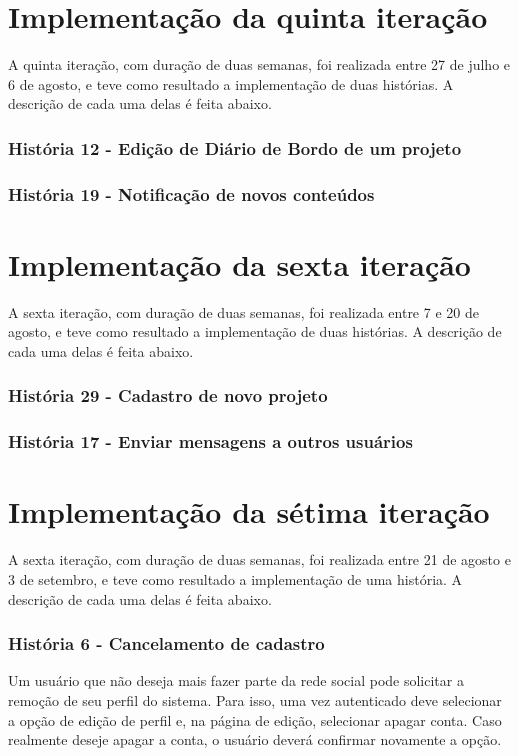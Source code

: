\documentclass[a4paper,12pt,font=plain,header=plain]{abnt}
\begin{document}
 \section{Implementação da quinta iteração}
    A quinta iteração, com duração de duas semanas, foi realizada entre 27 de julho e 6 de agosto, e teve como resultado a implementação de duas histórias. A descrição de cada uma delas é feita abaixo.

    \subsubsection{História 12 - Edição de Diário de Bordo de um projeto}

    \subsubsection{História 19 - Notificação de novos conteúdos}

 \section{Implementação da sexta iteração}
    A sexta iteração, com duração de duas semanas, foi realizada entre 7 e 20 de agosto, e teve como resultado a implementação de duas histórias. A descrição de cada uma delas é feita abaixo.

    \subsubsection{História 29 - Cadastro de novo projeto}

    \subsubsection{História 17 - Enviar mensagens a outros usuários}


 \section{Implementação da sétima iteração}
    A sexta iteração, com duração de duas semanas, foi realizada entre 21 de agosto e 3 de setembro, e teve como resultado a implementação de uma história. A descrição de cada uma delas é feita abaixo.

    \subsubsection{História 6 - Cancelamento de cadastro}
      Um usuário que não deseja mais fazer parte da rede social pode solicitar a remoção de seu perfil do sistema. Para isso, uma vez autenticado deve selecionar a opção de edição de perfil e, na página de edição, selecionar apagar conta. Caso realmente deseje apagar a conta, o usuário deverá confirmar novamente a opção.
\end{document}
